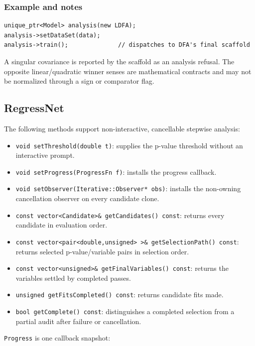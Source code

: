 \subsubsection{Example and notes}
\begin{verbatim}
unique_ptr<Model> analysis(new LDFA);
analysis->setDataSet(data);
analysis->train();              // dispatches to DFA's final scaffold
\end{verbatim}
A singular covariance is reported by the scaffold as an analysis refusal.  The
opposite linear/quadratic winner senses are mathematical contracts and may not
be normalized through a sign or comparator flag.

\subsection{RegressNet}
The following methods support non-interactive, cancellable stepwise analysis:

\begin{itemize}
\item \texttt{void setThreshold(double t)}: supplies the p-value threshold
      without an interactive prompt.
\item \texttt{void setProgress(ProgressFn f)}: installs the progress callback.
\item \texttt{void setObserver(Iterative::Observer* obs)}: installs the
      non-owning cancellation observer on every candidate clone.
\item \texttt{const vector<Candidate>\& getCandidates() const}: returns every
      candidate in evaluation order.
\item \texttt{const vector<pair<double,unsigned> >\& getSelectionPath() const}:
      returns selected p-value/variable pairs in selection order.
\item \texttt{const vector<unsigned>\& getFinalVariables() const}: returns the
      variables settled by completed passes.
\item \texttt{unsigned getFitsCompleted() const}: returns candidate fits made.
\item \texttt{bool getComplete() const}: distinguishes a completed selection
      from a partial audit after failure or cancellation.
\end{itemize}

\texttt{Progress} is one callback snapshot:


